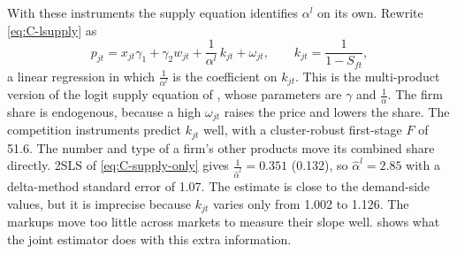 With these instruments the supply equation identifies $\alpha^l$ on its own. Rewrite \eqref{eq:C-lsupply} as
\begin{equation}\label{eq:C-supply-only}
  p_{jt} = x_{jt}\gamma_1 + \gamma_2 w_{jt} + \frac{1}{\alpha^l}\,k_{jt} + \omega_{jt}, \qquad k_{jt} = \frac{1}{1 - S_{ft}} ,
\end{equation}
a linear regression in which $\frac{1}{\alpha^l}$ is the coefficient on $k_{jt}$. This is the multi-product version of the
logit supply equation of \citet[eq.~31, p.~255]{Berry1994}, whose parameters are $\gamma$ and $\frac{1}{\alpha}$. The firm
share is endogenous, because a high $\omega_{jt}$ raises the price and lowers the share. The competition instruments predict
$k_{jt}$ well, with a cluster-robust first-stage $F$ of 51.6. The number and type of a firm's other products move its
combined share directly. 2SLS of \eqref{eq:C-supply-only} gives $\frac{1}{\hat\alpha^l} = 0.351$ (0.132), so
$\hat\alpha^l = 2.85$ with a delta-method standard error of 1.07. The estimate is close to the demand-side values, but it
is imprecise because $k_{jt}$ varies only from 1.002 to 1.126. The markups move too little across markets to measure their
slope well.  shows what the joint estimator does with this extra information.

